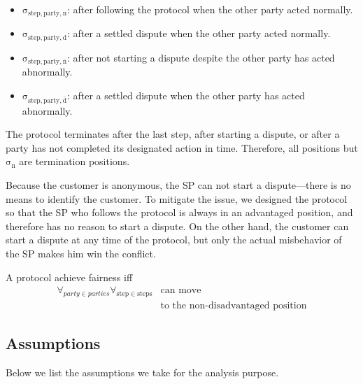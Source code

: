 \documentclass[pdftex,twocolumn,epjc3]{svjour3}
\begin{document}
{\begin{itemize}

\item
  $\mathrm{\sigma_{step,party,n}}$: after following the protocol when the other party acted normally.
\item
  $\mathrm{\sigma_{step,party,d}}$: after a settled dispute when the other party acted normally.
\item
  $\mathrm{\sigma_{step,party,\overline{n}}}$: after not starting a dispute despite the other party has acted abnormally.
\item
  $\mathrm{\sigma_{step,party,\overline{d}}}$: after a settled dispute when the other party has acted abnormally.
\end{itemize}



The protocol terminates after the last step, after starting a dispute, or after a party has not completed its designated action in time. Therefore, all positions but $\mathrm{\sigma_n}$ are termination positions.

Because the customer is anonymous, the SP can not start a dispute—there is no means to identify the customer. To mitigate the issue, we designed the protocol so that the SP who follows the protocol is always in an advantaged position, and therefore has no reason to start a dispute. On the other hand, the customer can start a dispute at any time of the protocol, but only the actual misbehavior of the SP makes him win the conflict.

\begin{definition}[Fairness] \label{def:fairness}
A protocol achieve fairness iff 
\begin{equation*}
\begin{split}
\forall_{party \in parties}\forall_{\mathrm{step} \in \mathrm{steps}} &\operatorname{can\ move}\\
&\operatorname{to\ the\ non-disadvantaged\ position} 
\end{split}
\end{equation*}

\end{definition}


\subsection{Assumptions}\label{sec:assumptions}

Below we list the assumptions we take for the analysis purpose.  

}
\end{document}
